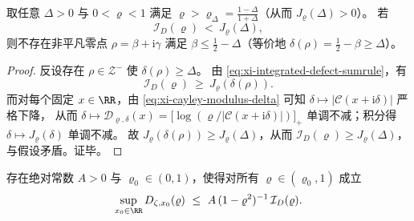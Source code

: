 \begin{corollary}[单半径平均证书给出的显式零点排除带]\label{cor:xi-integrated-defect-single-radius-exclusion-band}
取任意 \(\Delta>0\) 与 \(0<\varrho<1\) 满足 \(\varrho>\varrho_{\Delta}=\frac{1-\Delta}{1+\Delta}\)（从而 \(J_{\varrho}(\Delta)>0\)）。
若
\[
\mathcal{I}_D(\varrho)\ <\ J_{\varrho}(\Delta),
\]
则不存在非平凡零点 \(\rho=\beta+\mathrm{i}\gamma\) 满足 \(\beta\le \tfrac12-\Delta\)（等价地 \(\delta(\rho)=\tfrac12-\beta\ge \Delta\)）。
\end{corollary}
\begin{proof}
反设存在 \(\rho\in\mathcal{Z}^-\) 使 \(\delta(\rho)\ge \Delta\)。
由 \eqref{eq:xi-integrated-defect-sumrule}，有
\[
\mathcal{I}_D(\varrho)\ \ge\ J_{\varrho}(\delta(\rho)).
\]
而对每个固定 \(x\in\RR\)，由 \eqref{eq:xi-cayley-modulus-delta} 可知
\(\delta\mapsto|\mathcal{C}(x+\mathrm{i}\delta)|\) 严格下降，
从而 \(\delta\mapsto \mathcal{D}_{\varrho,\delta}(x)=\bigl[\log(\varrho/|\mathcal{C}(x+\mathrm{i}\delta)|)\bigr]_+\) 单调不减；积分得 \(\delta\mapsto J_{\varrho}(\delta)\) 单调不减。
故 \(J_{\varrho}(\delta(\rho))\ge J_{\varrho}(\Delta)\)，从而 \(\mathcal{I}_D(\varrho)\ge J_{\varrho}(\Delta)\)，与假设矛盾。证毕。
\end{proof}

\begin{conjecture}[平均缺陷到一致缺陷的自举不等式]\label{conj:xi-integrated-defect-to-uniform-bootstrap}
存在绝对常数 \(A>0\) 与 \(\varrho_0\in(0,1)\)，使得对所有 \(\varrho\in(\varrho_0,1)\) 成立
\[
\sup_{x_0\in\RR}D_{\zeta,x_0}(\varrho)\ \le\ A\,(1-\varrho^2)^{-1}\,\mathcal{I}_D(\varrho).
\]
\end{conjecture}

\endinput
